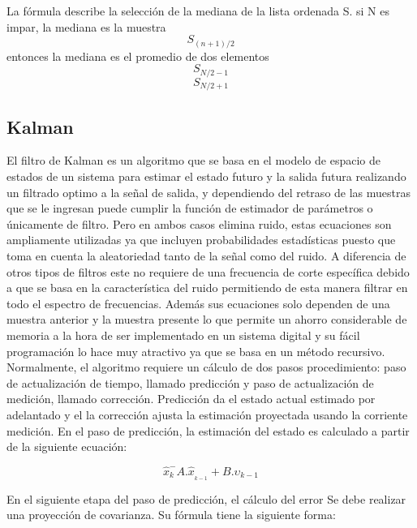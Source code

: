 \documentclass[10pt,a4paper]{article}
\begin{document}
La fórmula describe la selección de la mediana de la lista ordenada S. si N es impar, la mediana es la muestra 
\begin{equation}
 S_{(n+1)/2} 
\end{equation}
 entonces la mediana es el promedio de dos elementos 
\begin{equation}
S_{N/2-1}  
 \end{equation} 
\begin{equation}
S_{N/2+1}
 \end{equation} 

\subsection{ Kalman}

El filtro de Kalman es un algoritmo que se basa en el modelo de espacio de estados de un sistema para estimar el estado futuro y la salida futura realizando un filtrado optimo a la señal de salida, y dependiendo del retraso de las muestras que se le ingresan puede cumplir la función de estimador de parámetros o únicamente de filtro. Pero en ambos casos elimina ruido, estas ecuaciones son ampliamente utilizadas ya que incluyen probabilidades estadísticas puesto que toma en cuenta la aleatoriedad tanto de la señal como del ruido. A diferencia de otros tipos de filtros este no requiere de una frecuencia de corte específica debido a que se basa en la característica del ruido permitiendo de esta manera filtrar en todo el espectro de frecuencias. Además sus ecuaciones solo dependen de una muestra anterior y la muestra presente lo que permite un ahorro considerable de memoria a la hora de ser implementado en un sistema digital y su fácil programación lo hace muy atractivo ya que se basa en un método recursivo.
Normalmente, el algoritmo requiere un cálculo de dos pasos procedimiento: paso de actualización de tiempo, llamado predicción y paso de actualización de medición, llamado corrección. Predicción da el estado actual estimado por adelantado y el la corrección ajusta la estimación proyectada usando la corriente medición. En el paso de predicción, la estimación del estado es calculado a partir de la siguiente ecuación:

\begin{equation}
\widehat{x} _{k}^{-} A.\widehat{x}_{_{k-1}}+B.\upsilon _{k-1}
\end{equation}

En el siguiente etapa del paso de predicción, el cálculo del error
Se debe realizar una proyección de covarianza. Su fórmula tiene la siguiente forma:
\end{document}
